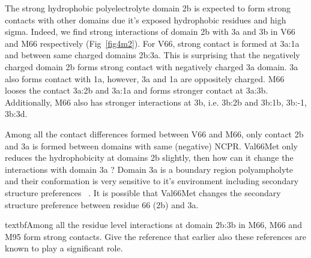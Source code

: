 \documentclass[journal=jacsat,manuscript=article]{achemso}
\begin{document}
The strong hydrophobic polyelectrolyte domain 2b is expected to form strong contacts with other domains due it's exposed hydrophobic residues and high sigma. Indeed, we find strong interactions of domain 2b with 3a and 3b in V66 and M66 respectively (Fig~\ref{fig4m2}). For V66, strong contact is formed at 3a:1a and between same charged domains 2b:3a. This is surprising that the negatively charged domain 2b forms strong contact with negatively charged 3a domain. 3a also forms contact with 1a, however, 3a and 1a are oppositely charged. M66 looses the contact 3a:2b and 3a:1a and forms stronger contact at 3a:3b. Additionally, M66 also has stronger interactions at 3b, i.e. 3b:2b and 3b:1b, 3b:-1, 3b:3d. 

Among all the contact differences formed between V66 and M66, only contact 2b and 3a is formed between domains with same (negative) NCPR. Val66Met only reduces the hydrophobicity at domains 2b slightly, then how can it change the interactions with domain 3a ? Domain 3a is a boundary region polyampholyte and their conformation is very sensitive to it's environment including secondary structure preferences ~\cite{Das2013a}. It is possible that Val66Met changes the secondary structure preference between residue 66 (2b) and 3a.

textbf{Among all the residue level interactions at domain 2b:3b in M66, M66 and M95 form strong contacts. Give the reference that earlier also these references are known to play a significant role. } %
\end{document}

